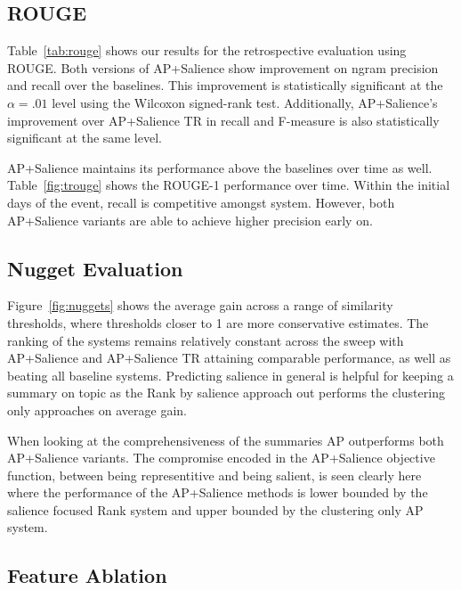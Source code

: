 \subsection{ROUGE}

Table~\ref{tab:rouge} shows our results for the retrospective evaluation using ROUGE. 
Both versions of AP+Salience show improvement on ngram precision and recall over the 
baselines. This improvement is statistically significant at the $\alpha = .01$ level
using the Wilcoxon signed-rank test. Additionally, AP+Salience's improvement over
AP+Salience TR in recall and F-measure is also statistically significant at the same level.

AP+Salience maintains its performance above the baselines over time as well. Table~\ref{fig:trouge}
shows the ROUGE-1 performance over time. Within the initial days of the event, recall is 
competitive amongst system. However, both AP+Salience variants are able to achieve higher
precision early on.  

\subsection{Nugget Evaluation}

Figure~\ref{fig:nuggets} shows the average gain across a range of 
similarity thresholds, where thresholds closer to 1 are more conservative
estimates. The ranking of the systems remains relatively constant across the 
sweep with 
AP+Salience and AP+Salience TR attaining comparable performance, as well
as beating all baseline systems.
Predicting salience in general is helpful for keeping a summary on topic as
the Rank by salience approach out performs the clustering only approaches
on average gain.

When looking at the comprehensiveness of the summaries AP outperforms
both AP+Salience variants. The compromise encoded in the AP+Salience objective
function, between being representitive and being salient, is seen clearly here
where the performance of the AP+Salience methods is lower bounded by 
the salience focused Rank
system and upper bounded by the clustering only AP system.



\subsection{Feature Ablation}


